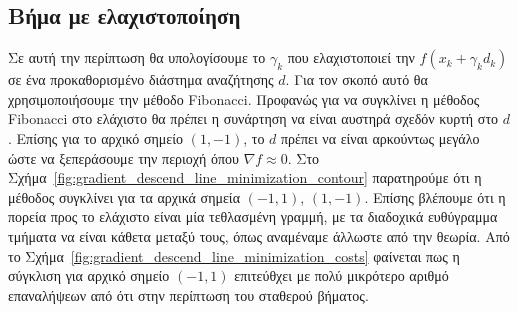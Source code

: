 \documentclass[a4paper,12pt]{article}
\begin{document}
\subsection*{Βήμα με ελαχιστοποίηση}
Σε αυτή την περίπτωση θα υπολογίσουμε το $\gamma_k$ που ελαχιστοποιεί την $f(x_k + \gamma_k d_k)$ σε ένα προκαθορισμένο
διάστημα αναζήτησης $d$. Για τον σκοπό αυτό θα χρησιμοποιήσουμε την μέθοδο  Fibonacci.
 Προφανώς για να συγκλίνει η μέθοδος  Fibonacci  
στο ελάχιστο θα πρέπει η συνάρτηση να είναι αυστηρά σχεδόν κυρτή στο $d$. Επίσης για το αρχικό σημείο $(1, -1)$, 
το $d$ πρέπει να είναι αρκούντως μεγάλο ώστε να ξεπεράσουμε την περιοχή όπου $\nabla f \approx 0$. Στο 
Σχήμα~\ref{fig:gradient_descend_line_minimization_contour}
παρατηρούμε ότι η μέθοδος συγκλίνει για τα αρχικά σημεία $(-1, 1)$, $(1, -1)$. Επίσης βλέπουμε ότι η πορεία προς το 
ελάχιστο είναι μία τεθλασμένη γραμμή, με τα διαδοχικά ευθύγραμμα τμήματα να είναι κάθετα μεταξύ τους, όπως αναμέναμε
άλλωστε από την θεωρία. Από το Σχήμα~\ref{fig:gradient_descend_line_minimization_costs} φαίνεται πως η σύγκλιση για 
αρχικό σημείο $(-1, 1)$ επιτεύθχει με πολύ μικρότερο αριθμό επαναλήψεων από ότι στην περίπτωση του σταθερού βήματος.
\end{document}
